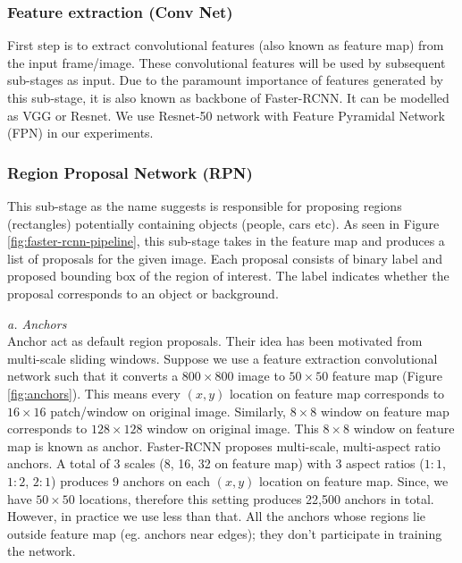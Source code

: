 \subsubsection{Feature extraction (Conv Net)}
First step is to extract convolutional features (also known as feature map) from the input frame/image. These convolutional features will be used by subsequent sub-stages as input. Due to the paramount importance of features generated by this sub-stage, it is also known as backbone of Faster-RCNN. It can be modelled as VGG\cite{simonyan2014very} or Resnet\cite{he2016deep}. We use Resnet-50 network with Feature Pyramidal Network (FPN)\cite{lin2017feature} in our experiments. 


\subsubsection{Region Proposal Network (RPN)}
This sub-stage as the name suggests is responsible for proposing regions (rectangles) potentially containing objects (people, cars etc). As seen in Figure \ref{fig:faster-rcnn-pipeline}, this sub-stage takes in the feature map and produces a list of proposals for the given image. Each proposal consists of binary label and proposed bounding box of the region of interest. The label indicates whether the proposal corresponds to an object or background. 

\vspace{5pt}
\textit{a. Anchors}\\
Anchor act as default region proposals. Their idea has been motivated from multi-scale sliding windows. Suppose we use a feature extraction convolutional network such that it converts a $800\times800$ image to $50\times50$ feature map (Figure \ref{fig:anchors}). This means every $(x,y)$ location on feature map corresponds to $16\times16$ patch/window on original image. Similarly, $8\times8$ window on feature map corresponds to $128\times128$ window on original image. This $8\times8$ window on feature map is known as anchor. Faster-RCNN proposes multi-scale, multi-aspect ratio anchors. A total of 3 scales (8, 16, 32 on feature map) with 3 aspect ratios ($1:1$, $1:2$, $2:1$) produces 9 anchors on each $(x,y)$ location on feature map. Since, we have $50\times50$ locations, therefore this setting produces 22,500 anchors in total. However, in practice we use less than that. All the anchors whose regions lie outside feature map (eg. anchors near edges); they don't participate in training the network. 


